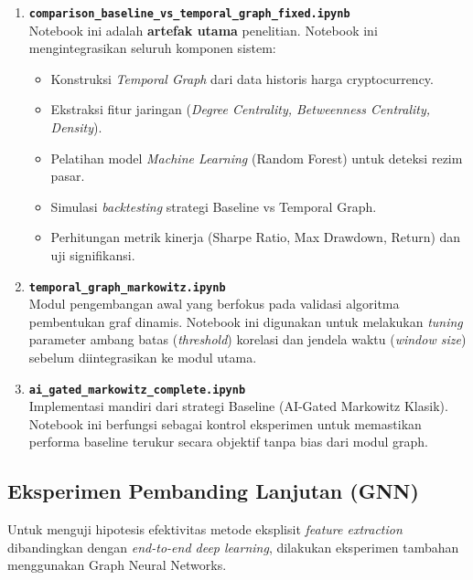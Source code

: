 \begin{enumerate}
    \item \textbf{\texttt{comparison\_baseline\_vs\_temporal\_graph\_fixed.ipynb}} \\
    Notebook ini adalah \textbf{artefak utama} penelitian. Notebook ini mengintegrasikan seluruh komponen sistem:
    \begin{itemize}
        \item Konstruksi \textit{Temporal Graph} dari data historis harga cryptocurrency.
        \item Ekstraksi fitur jaringan (\textit{Degree Centrality, Betweenness Centrality, Density}).
        \item Pelatihan model \textit{Machine Learning} (Random Forest) untuk deteksi rezim pasar.
        \item Simulasi \textit{backtesting} strategi Baseline vs Temporal Graph.
        \item Perhitungan metrik kinerja (Sharpe Ratio, Max Drawdown, Return) dan uji signifikansi.
    \end{itemize}
    
    \item \textbf{\texttt{temporal\_graph\_markowitz.ipynb}} \\
    Modul pengembangan awal yang berfokus pada validasi algoritma pembentukan graf dinamis. Notebook ini digunakan untuk melakukan \textit{tuning} parameter ambang batas (\textit{threshold}) korelasi dan jendela waktu (\textit{window size}) sebelum diintegrasikan ke modul utama.
    
    \item \textbf{\texttt{ai\_gated\_markowitz\_complete.ipynb}} \\
    Implementasi mandiri dari strategi Baseline (AI-Gated Markowitz Klasik). Notebook ini berfungsi sebagai kontrol eksperimen untuk memastikan performa baseline terukur secara objektif tanpa bias dari modul graph.
\end{enumerate}

\subsection{Eksperimen Pembanding Lanjutan (GNN)}
Untuk menguji hipotesis efektivitas metode eksplisit \textit{feature extraction} dibandingkan dengan \textit{end-to-end deep learning}, dilakukan eksperimen tambahan menggunakan Graph Neural Networks.

